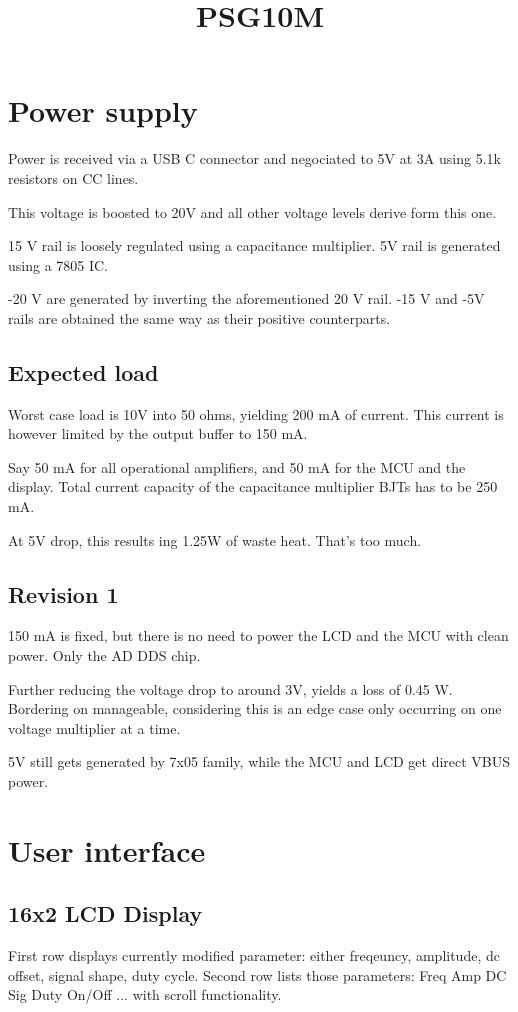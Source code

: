\documentclass[11pt]{article}
\title{PSG10M}
\begin{document}
\maketitle
\pagebreak
\tableofcontents
\pagebreak

\section{Power supply}
Power is received via a USB C connector and negociated 
to 5V at 3A using 5.1k resistors on CC lines.

This voltage is boosted to 20V and all other voltage 
levels derive form this one. 

15 V rail is loosely regulated using a capacitance
multiplier. 5V rail is generated using a 7805 IC.

-20 V are generated by inverting the aforementioned 20 V
rail. -15 V and -5V rails are obtained the same way as 
their positive counterparts.

\subsection{Expected load}
Worst case load is 10V into 50 ohms, yielding 200 mA 
of current. This current is however limited by the 
output buffer to 150 mA. 

Say 50 mA for all operational amplifiers, and 50 mA for 
the MCU and the display. Total current capacity of the 
capacitance multiplier BJTs has to be 250 mA.

At 5V drop, this results ing 1.25W of waste heat. 
That's too much.

\subsection{Revision 1}
150 mA is fixed, but there is no need to power the 
LCD and the MCU with clean power. Only the AD DDS chip.

Further reducing the voltage drop to around 3V, yields 
a loss of 0.45 W. Bordering on manageable, considering 
this is an edge case only occurring on one voltage 
multiplier at a time.

5V still gets generated by 7x05 family, while the 
MCU and LCD get direct VBUS power.


\pagebreak
\section{User interface}
\subsection{16x2 LCD Display}
First row displays currently modified parameter: either freqeuncy, amplitude, 
dc offset, signal shape, duty cycle.
Second row lists those parameters: 
Freq Amp DC Sig Duty On/Off ... with scroll functionality.
\end{document}
